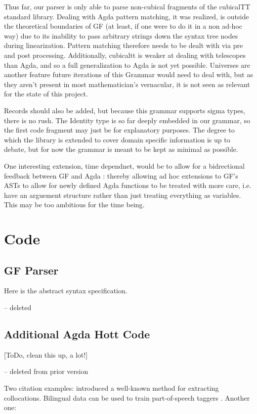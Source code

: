 \documentclass[11pt, a4paper]{article}
\begin{document}
Thus far, our parser is only able to parse non-cubical fragments of the
cubicalTT standard library. Dealing with Agda pattern matching, it was realized,
is outside the theoretical boundaries of GF (at least, if one were to do it in a
non ad-hoc way) due to its inability to pass arbitrary strings down the syntax
tree nodes during linearization. Pattern matching therefore needs to be dealt
with via pre and post processing. Additionally, cubicaltt is weaker at dealing
with telescopes than Agda, and so a full generalization to Agda is not yet
possible. Universes are another feature future iterations of this Grammar would
need to deal with, but as they aren't present in most mathematician's
vernacular, it is not seen as relevant for the state of this project.

Records should also be added, but because this grammar supports sigma types,
there is no rush. The Identity type is so far deeply embedded in our grammar, so
the first code fragment may just be for explanatory purposes. The degree to
which the library is extended to cover domain specific information is up to
debate, but for now the grammar is meant to be kept as minimal as possible.

One interesting extension, time dependnet, would be to allow for a bidrectional
feedback between GF and Agda : thereby allowing ad hoc extensions to GF's ASTs
to allow for newly defined Agda functions to be treated with more care, i.e.
have an arguement structure rather than just treating everything as variables.
This may be too ambitious for the time being.

\section{Code}

\subsection{GF Parser}

Here is the abstract syntax specification.

-- deleted

\subsection{Additional Agda Hott Code}

[ToDo, clean this up, a lot!]

-- deleted from prior version


Two citation examples: \cite{dunning1993} introduced a well-known method for
extracting collocations. Bilingual data can be used to train part-of-speech
taggers \citep{das2011}. Another one: \citep{cortes2014}
\end{document}
